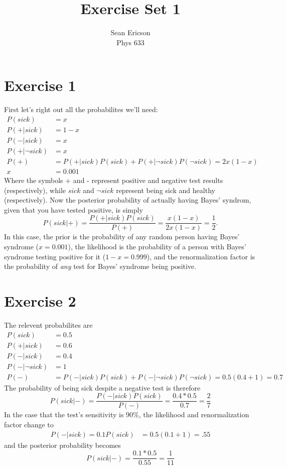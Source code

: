 \documentclass[12pt]{article}
\begin{document}
	
\title{Exercise Set 1}
\author{Sean Ericson \\ Phys 633}
\maketitle

\section*{Exercise 1}
First let's right out all the probabilites we'll need:
\begin{align*}
    P(sick) &= x \\
    P(+|sick) &= 1-x \\
    P(-|sick) &= x \\
    P(+|\neg sick) &= x \\
    P(+) &= P(+|sick)P(sick) + P(+|\neg sick)P(\neg sick) = 2x(1-x) \\
    x &= 0.001
\end{align*}
Where the symbols + and - represent positive and negative test results (respectively), while $sick$ and $\neg sick$ represent being sick and healthy (respectively). Now the posterior probability of actually having Bayes' syndrom, given that you have tested positive, is simply
\[ P(sick|+) = \frac{P(+|sick)P(sick)}{P(+)} = \frac{x(1-x)}{2x(1-x)} = \frac{1}{2}. \]
In this case, the prior is the probability of any random person having Bayes' syndrome ($x=0.001$), the likelihood is the probability of a person with Bayes' syndrome testing positive for it ($1-x=0.999$), and the renormalization factor is the probability of \textit{any} test for Bayes' syndrome being positive.

\section*{Exercise 2}
The relevent probabilites are
\begin{align*}
    P(sick) &= 0.5 \\
    P(+|sick) &= 0.6 \\
    P(-|sick) &= 0.4 \\
    P(-|\neg sick) &= 1 \\
    P(-) &= P(-|sick)P(sick) + P(-|\neg sick)P(\neg sick) = 0.5(0.4 + 1) = 0.7
\end{align*}
The probability of being sick despite a negative test is therefore
\[ P(sick|-) = \frac{P(-|sick)P(sick)}{P(-)} = \frac{0.4*0.5}{0.7} = \frac{2}{7} \] 
In the case that the test's sensitivity is $90\%$, the likelihood and renormalization factor change to
\begin{align*}
    P(-|sick) = 0.1
    P(sick) &= 0.5(0.1 + 1) = .55
\end{align*}
and the posterior probability becomes
\[ P(sick|-) = \frac{0.1 * 0.5}{0.55} = \frac{1}{11} \]
\end{document}
